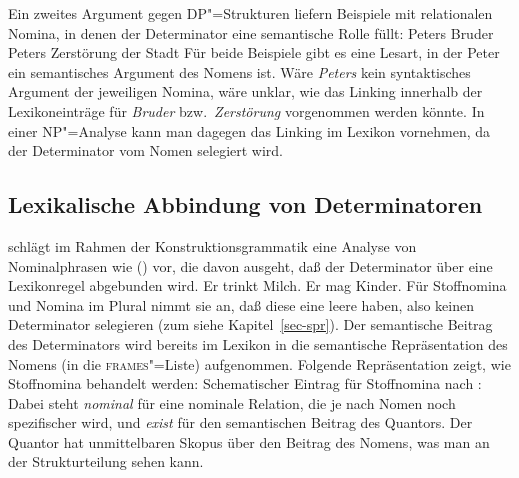 Ein zweites Argument gegen DP"=Strukturen liefern Beispiele mit relationalen Nomina, in denen der
Determinator eine semantische Rolle füllt:
\eal
\ex Peters Bruder
\ex Peters Zerstörung der Stadt
\zl
Für beide Beispiele gibt es eine Lesart, in der Peter ein semantisches Argument des Nomens ist. Wäre
\emph{Peters} kein syntaktisches Argument der jeweiligen Nomina, wäre unklar, wie das Linking
innerhalb der Lexikoneinträge für \emph{Bruder} bzw.\ \emph{Zerstörung} vorgenommen werden
könnte. In einer NP"=Analyse kann man dagegen das Linking im Lexikon vornehmen, da der Determinator
vom Nomen selegiert wird.%

\subsection{Lexikalische Abbindung von Determinatoren}

\mbox{}\citet[]{Michaelis2006a} schlägt im Rahmen der
Konstruktionsgrammatik eine Analyse von Nominalphrasen wie () vor, die davon ausgeht, daß der
Determinator über eine Lexikonregel abgebunden wird.
\eal
\ex Er trinkt Milch.
\ex Er mag Kinder.
\zl
Für Stoffnomina und Nomina im  Plural nimmt sie an, daß diese eine leere \sprl haben, also keinen
Determinator selegieren (zum \sprm siehe Kapitel~\ref{sec-spr}). Der semantische Beitrag des
Determinators wird bereits im Lexikon in die semantische Repräsentation des Nomens (in die \textsc{frames}"=Liste) aufgenommen. Folgende Repräsentation zeigt, wie Stoffnomina behandelt werden:
\ea
Schematischer Eintrag für Stoffnomina nach \citet[]{Michaelis2006a}:\\
\z
Dabei steht \emph{nominal} für eine nominale Relation, die je nach Nomen noch spezifischer wird, und
\emph{exist} für den semantischen Beitrag des Quantors. Der Quantor hat unmittelbaren Skopus über
den Beitrag des Nomens, was man an der Strukturteilung  sehen kann.

